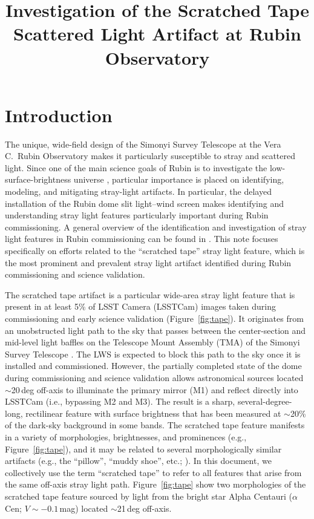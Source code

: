 \documentclass[SE,lsstdraft,authoryear,toc]{lsstdoc}
\title{Investigation of the Scratched Tape Scattered Light Artifact at Rubin Observatory}
\date{\vcsDate}
\begin{document}
\maketitle


\section{Introduction}
\label{sec:introduction}

The unique, wide-field design of the Simonyi Survey Telescope at the Vera C.\ Rubin Observatory makes it particularly susceptible to stray and scattered light. Since one of the main science goals of Rubin is to investigate the low-surface-brightness universe \citep{2019ApJ...873..111I}, particular importance is placed on identifying, modeling, and mitigating stray-light artifacts. In particular, the delayed installation of the Rubin dome slit light--wind screen \citep[LWS;][]{Marchiori:2024} makes identifying and understanding stray light features particularly important during Rubin commissioning. A general overview of the identification and investigation of stray light features in Rubin commissioning can be found in \citet{SITCOMTN-160}. This note focuses specifically on efforts related to the ``scratched tape'' stray light feature, which is the most prominent and prevalent stray light artifact identified during Rubin commissioning and science validation.

The scratched tape artifact is a particular wide-area stray light feature that is present in at least 5\% of LSST Camera (LSSTCam) images taken during commissioning and early science validation (Figure~\ref{fig:tape}). It originates from an unobstructed light path to the sky that passes between the center-section and mid-level light baffles on the Telescope Mount Assembly (TMA) of the Simonyi Survey Telescope \citep{2022SPIE12182E..0WT}. The LWS is expected to block this path to the sky once it is installed and commissioned.  However, the partially completed state of the dome during commissioning and science validation allows astronomical sources located $\sim$20\,deg off-axis to illuminate the primary mirror (M1) and reflect directly into LSSTCam (i.e., bypassing M2 and M3). The result is a sharp, several-degree-long, rectilinear feature with surface brightness that has been measured at $\sim$20\% of the dark-sky background in some bands.
The scratched tape feature manifests in a variety of morphologies, brightnesses, and prominences (e.g., Figure~\ref{fig:tape}), and it may be related to several morphologically similar artifacts (e.g., the ``pillow'', ``muddy shoe'', etc.; \citealt{SITCOMTN-160}). In this document, we collectively use the term ``scratched tape'' to refer to all features that arise from the same off-axis stray light path.
Figure~\ref{fig:tape} show two morphologies of the scratched tape feature sourced by light from the bright star Alpha Centauri ($\alpha$Cen; $V \sim -0.1$\,mag) located $\sim$21\,deg off-axis.
\end{document}
